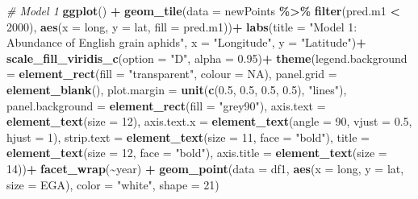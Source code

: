 \documentclass[
]{book}
\newenvironment{Shaded}{\begin{snugshade}}{\end{snugshade}}
\newcommand{\AttributeTok}[1]{\textcolor[rgb]{0.13,0.29,0.53}{#1}}
\newcommand{\CommentTok}[1]{\textcolor[rgb]{0.56,0.35,0.01}{\textit{#1}}}
\newcommand{\ConstantTok}[1]{\textcolor[rgb]{0.56,0.35,0.01}{#1}}
\newcommand{\DecValTok}[1]{\textcolor[rgb]{0.00,0.00,0.81}{#1}}
\newcommand{\FloatTok}[1]{\textcolor[rgb]{0.00,0.00,0.81}{#1}}
\newcommand{\FunctionTok}[1]{\textcolor[rgb]{0.13,0.29,0.53}{\textbf{#1}}}
\newcommand{\NormalTok}[1]{#1}
\newcommand{\SpecialCharTok}[1]{\textcolor[rgb]{0.81,0.36,0.00}{\textbf{#1}}}
\newcommand{\StringTok}[1]{\textcolor[rgb]{0.31,0.60,0.02}{#1}}
\begin{document}
\begin{Shaded}
\begin{Highlighting}[]
\CommentTok{\# Model 1}
\FunctionTok{ggplot}\NormalTok{() }\SpecialCharTok{+}
  \FunctionTok{geom\_tile}\NormalTok{(}\AttributeTok{data =}\NormalTok{ newPoints }\SpecialCharTok{\%\textgreater{}\%} \FunctionTok{filter}\NormalTok{(pred.m1 }\SpecialCharTok{\textless{}} \DecValTok{2000}\NormalTok{), }\FunctionTok{aes}\NormalTok{(}\AttributeTok{x =}\NormalTok{ long, }\AttributeTok{y =}\NormalTok{ lat, }\AttributeTok{fill =}\NormalTok{ pred.m1))}\SpecialCharTok{+}
  \FunctionTok{labs}\NormalTok{(}\AttributeTok{title =} \StringTok{"Model 1: Abundance of English grain aphids"}\NormalTok{, }\AttributeTok{x =} \StringTok{"Longitude"}\NormalTok{, }\AttributeTok{y =} \StringTok{"Latitude"}\NormalTok{)}\SpecialCharTok{+}
  \FunctionTok{scale\_fill\_viridis\_c}\NormalTok{(}\AttributeTok{option =} \StringTok{"D"}\NormalTok{, }\AttributeTok{alpha =} \FloatTok{0.95}\NormalTok{)}\SpecialCharTok{+}
  \FunctionTok{theme}\NormalTok{(}\AttributeTok{legend.background =} \FunctionTok{element\_rect}\NormalTok{(}\AttributeTok{fill =} \StringTok{"transparent"}\NormalTok{, }\AttributeTok{colour =} \ConstantTok{NA}\NormalTok{),}
        \AttributeTok{panel.grid =} \FunctionTok{element\_blank}\NormalTok{(),}
        \AttributeTok{plot.margin =} \FunctionTok{unit}\NormalTok{(}\FunctionTok{c}\NormalTok{(}\FloatTok{0.5}\NormalTok{, }\FloatTok{0.5}\NormalTok{, }\FloatTok{0.5}\NormalTok{, }\FloatTok{0.5}\NormalTok{), }\StringTok{"lines"}\NormalTok{),}
        \AttributeTok{panel.background =} \FunctionTok{element\_rect}\NormalTok{(}\AttributeTok{fill =} \StringTok{"grey90"}\NormalTok{),}
        \AttributeTok{axis.text =} \FunctionTok{element\_text}\NormalTok{(}\AttributeTok{size =} \DecValTok{12}\NormalTok{), }
        \AttributeTok{axis.text.x =} \FunctionTok{element\_text}\NormalTok{(}\AttributeTok{angle =} \DecValTok{90}\NormalTok{, }\AttributeTok{vjust =} \FloatTok{0.5}\NormalTok{, }\AttributeTok{hjust =} \DecValTok{1}\NormalTok{),}
        \AttributeTok{strip.text =} \FunctionTok{element\_text}\NormalTok{(}\AttributeTok{size =} \DecValTok{11}\NormalTok{, }\AttributeTok{face =} \StringTok{"bold"}\NormalTok{),}
        \AttributeTok{title =} \FunctionTok{element\_text}\NormalTok{(}\AttributeTok{size =} \DecValTok{12}\NormalTok{, }\AttributeTok{face =} \StringTok{"bold"}\NormalTok{),}
        \AttributeTok{axis.title =} \FunctionTok{element\_text}\NormalTok{(}\AttributeTok{size =} \DecValTok{14}\NormalTok{))}\SpecialCharTok{+}
  \FunctionTok{facet\_wrap}\NormalTok{(}\SpecialCharTok{\textasciitilde{}}\NormalTok{year) }\SpecialCharTok{+}
  \FunctionTok{geom\_point}\NormalTok{(}\AttributeTok{data =}\NormalTok{ df1, }\FunctionTok{aes}\NormalTok{(}\AttributeTok{x =}\NormalTok{ long, }\AttributeTok{y =}\NormalTok{ lat, }\AttributeTok{size =}\NormalTok{ EGA), }\AttributeTok{color =} \StringTok{"white"}\NormalTok{, }\AttributeTok{shape =} \DecValTok{21}\NormalTok{) }
\end{Highlighting}
\end{Shaded}
\end{document}
